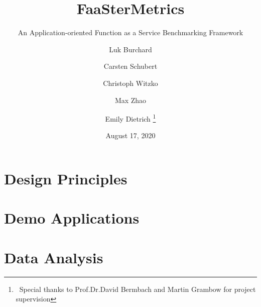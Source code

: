 \documentclass[english,12pt,numbers=noenddot]{scrreprt}
\newif\ifmtrklnum{}
\begin{document}
%
\titlehead{%
  \texttt{[image: MCC\_Header.png]}
}
%
\title{FaaSterMetrics}
\subtitle{An Application-oriented Function as a Service Benchmarking Framework}
%
\ifmtrklnum{}
\author{Luk Burchard (381691)
  \and Carsten Schubert (380852) 
  \and Christoph Witzko (373678)
  \and Max Zhao (381644)
  \and Emily Dietrich (380817)~%
  \thanks{~Special thanks to Prof.\@ Dr.\@ David Bermbach and Martin Grambow for project supervision}}
\else
\author{Luk Burchard %
  \and Carsten Schubert %
  \and Christoph Witzko %
  \and Max Zhao %
  \and Emily Dietrich%
  \thanks{~Special thanks to Prof.\@ Dr.\@ David Bermbach and Martin Grambow for project supervision}}
\fi
%
\date{August 17, 2020}
\maketitle

\renewcommand*\contentsname{Structure}
\tableofcontents
\listoffigures
\listoftables
\newpage



\chapter{Design Principles}\label{chap:DesignPrinciples}





%
%

\chapter{Demo Applications}\label{chap:DemoApplications}




\chapter{Data Analysis}\label{chap:analysis}

\end{document}
